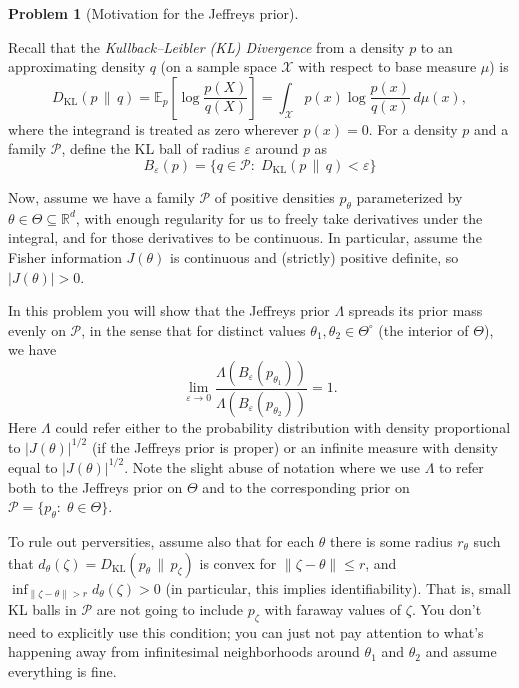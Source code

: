 \documentclass{article}
\newcommand{\cP}{\mathcal{P}}
\newcommand{\cX}{\mathcal{X}}
\newcommand{\EE}{\mathbb{E}}
\newcommand{\RR}{\mathbb{R}}
\newcommand{\ep}{\varepsilon}
\theoremstyle{definition}
\newtheorem{problem}{Problem}
\begin{document}
\begin{problem}[Motivation for the Jeffreys prior]
\label{prob:motivate-jeffreys}

Recall that the {\em Kullback--Leibler (KL) Divergence} from a density $p$ to an approximating density $q$ (on a sample space $\cX$ with respect to base measure $\mu$) is
\[
D_{\text{KL}}(p \,\|\, q) = \EE_p\left[\log\frac{p(X)}{q(X)}\right] = \int_\cX p(x)\log\frac{p(x)}{q(x)}\,d\mu(x),
\]
where the integrand is treated as zero wherever $p(x) = 0$. For a density $p$ and a family $\cP$, define the KL ball of radius $\ep$ around $p$ as
\[
B_\ep(p) = \{q\in\cP:\; D_{\text{KL}}(p\,\|\,q) < \ep\}
\]

Now, assume we have a family $\cP$ of positive densities $p_\theta$ parameterized by $\theta \in \Theta \subseteq \RR^d$, with enough regularity for us to freely take derivatives under the integral, and for those derivatives to be continuous. In particular, assume the Fisher information $J(\theta)$ is continuous and (strictly) positive definite, so $|J(\theta)|>0$.

In this problem you will show that the Jeffreys prior $\Lambda$ spreads its prior mass evenly on $\cP$, in the sense that for distinct values $\theta_1,\theta_2\in\Theta^{\circ}$ (the interior of $\Theta$), we have
\[
\lim_{\ep \to 0} \frac{\Lambda(B_\ep(p_{\theta_1}))}{\Lambda(B_\ep(p_{\theta_2}))} = 1.
\]
Here $\Lambda$ could refer either to the probability distribution with density proportional to $|J(\theta)|^{1/2}$ (if the Jeffreys prior is proper) or an infinite measure with density equal to $|J(\theta)|^{1/2}$. Note the slight abuse of notation where we use $\Lambda$ to refer both to the Jeffreys prior on $\Theta$ and to the corresponding prior on $\cP = \{p_{\theta}:\;\theta\in \Theta\}$.

To rule out perversities, assume also that for each $\theta$ there is some radius $r_\theta$ such that $d_\theta(\zeta) = D_{\text{KL}}(p_{\theta}\,\|\,p_{\zeta})$ is convex for $\|\zeta-\theta\| \leq r$, and $\inf_{\|\zeta - \theta\| > r} d_\theta(\zeta) > 0$ (in particular, this implies identifiability). That is, small KL balls in $\cP$ are not going to include $p_\zeta$ with faraway values of $\zeta$. You don't need to explicitly use this condition; you can just not pay attention to what's happening away from infinitesimal neighborhoods around $\theta_1$ and $\theta_2$ and assume everything is fine.

\begin{enumerate}[(a)]


\end{enumerate}
\end{problem}
\end{document}
